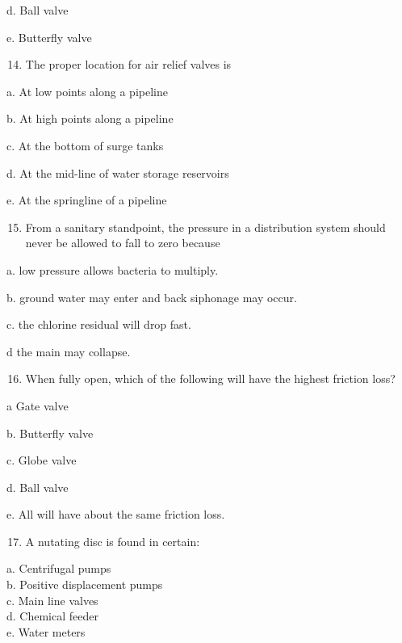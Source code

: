 \documentclass[10pt]{article}
\begin{document}
\begin{enumerate}
\begin{enumerate}
d. Ball valve

e. Butterfly valve

\begin{enumerate}
  \setcounter{enumi}{13}
  \item The proper location for air relief valves is
\end{enumerate}

a. At low points along a pipeline

b. At high points along a pipeline

c. At the bottom of surge tanks

d. At the mid-line of water storage reservoirs

e. At the springline of a pipeline

\begin{enumerate}
  \setcounter{enumi}{14}
  \item From a sanitary standpoint, the pressure in a distribution system should never be allowed to fall to zero because
\end{enumerate}

a. low pressure allows bacteria to multiply.

b. ground water may enter and back siphonage may occur.

c. the chlorine residual will drop fast.

$\mathrm{d}$ the main may collapse.

\begin{enumerate}
  \setcounter{enumi}{15}
  \item When fully open, which of the following will have the highest friction loss?
\end{enumerate}

a Gate valve

b. Butterfly valve

c. Globe valve

d. Ball valve

e. All will have about the same friction loss.

\begin{enumerate}
  \setcounter{enumi}{16}
  \item A nutating disc is found in certain:\\
\end{enumerate}

a. Centrifugal pumps\\

b. Positive displacement pumps\\
c. Main line valves\\
d. Chemical feeder\\
e. Water meters


\end{enumerate}
\end{enumerate}
\end{document}
